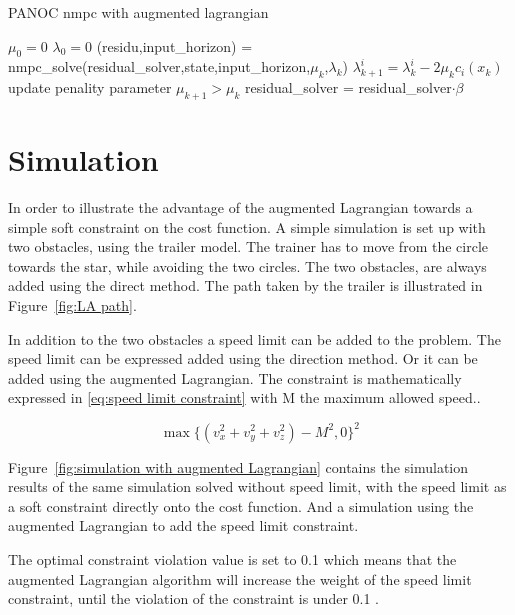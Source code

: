 	\begin{algorithm}
		\caption{PANOC nmpc with augmented lagrangian}
		\label{alg:PANOC with augmented lagrangian}
		\begin{algorithmic}[1]
			\State $\mu_0=0$
			\State $\lambda_0=0$
			\State (residu,input\_horizon) = nmpc\_solve(residual\_solver,state,input\_horizon,$\mu_k$,$\lambda_k$)
			\State $\lambda_{k+1}^{i} = \lambda_{k}^{i} - 2\mu_k c_i(x_k)$
			\State update penality parameter $\mu_{k+1}>\mu_k$
			\State residual\_solver =  residual\_solver$\cdot \beta$
			\EndWhile
			\EndProcedure
		\end{algorithmic}
	\end{algorithm}

\section{Simulation}
In order to illustrate the advantage of the augmented Lagrangian towards a simple soft constraint on the cost function. A simple simulation is set up with two obstacles, using the trailer model. The trainer has to move from the circle towards the star, while avoiding the two circles. The two obstacles, are always added using the direct method. The path taken by the trailer is illustrated in Figure~\ref{fig:LA path}.

In addition to the two obstacles a speed limit can be added to the problem. The speed limit can be expressed added using the direction method. Or it can be added using the augmented Lagrangian. The  constraint is mathematically expressed in \eqref{eq:speed limit constraint} with M the maximum allowed speed..

\begin{equation}
\max\{(v_x^2+v_y^2+v_z^2)-M^2,0\}^2
\label{eq:speed limit constraint}
\end{equation}

Figure~\ref{fig:simulation with augmented Lagrangian} contains the simulation results of the same simulation solved without speed limit, with the speed limit as a soft constraint directly onto the cost function. And a simulation using the augmented Lagrangian to add the speed limit constraint.

The optimal constraint violation value is set to 0.1 which means that the augmented Lagrangian algorithm will increase the weight of the speed limit constraint, until the violation of the constraint is under 0.1 . 

